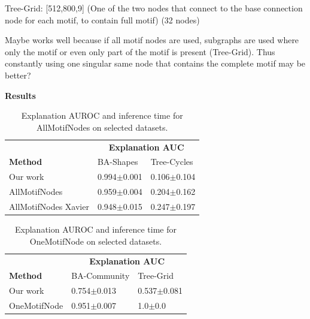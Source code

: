 Tree-Grid:
[512,800,9]
(One of the two nodes that connect to the base connection node for each motif, to contain full motif) (32 nodes)

Maybe works well because if all motif nodes are used, subgraphs are used where only the motif or even only part of the motif is present (Tree-Grid). Thus constantly using one singular same node that contains the complete motif may be better?


\textbf{Results}

\begin{table}[ht]
    \centering
    \scriptsize
    \begin{tabularx}{0.6\textwidth}{l*{2}{X}}   %
    \toprule
    \textbf{} & \multicolumn{2}{c}{\textbf{Explanation AUC}} \\
    \cmidrule{2-3}
    \textbf{Method} & BA-Shapes & Tree-Cycles \\
    \midrule
    Our work & 0.994$\pm$0.001 & 0.106$\pm$0.104 \\
    \midrule
    AllMotifNodes & 0.959$\pm$0.004 & 0.204$\pm$0.162 \\
    \midrule
    AllMotifNodes Xavier & 0.948$\pm$0.015 & 0.247$\pm$0.197 \\
    \bottomrule
    \end{tabularx}
    \caption[Inductive performance using all motif nodes for training]{Explanation AUROC and inference time for AllMotifNodes on selected datasets.}
    \label{tab:allmotifnodes_selected}
\end{table}

\begin{table}[ht]
    \centering
    \scriptsize
    \begin{tabularx}{0.6\textwidth}{l*{2}{X}}   %
    \toprule
    \textbf{} & \multicolumn{2}{c}{\textbf{Explanation AUC}} \\
    \cmidrule{2-3}
    \textbf{Method} & BA-Community & Tree-Grid \\
    \midrule
    Our work & 0.754$\pm$0.013 & 0.537$\pm$0.081 \\
    \midrule
    OneMotifNode & 0.951$\pm$0.007 & 1.0$\pm$0.0 \\
    \bottomrule
    \end{tabularx}
    \caption[Inductive performance using one motif node for training]{Explanation AUROC and inference time for OneMotifNode on selected datasets.}
    \label{tab:allmotifnodes_selected}
\end{table}


